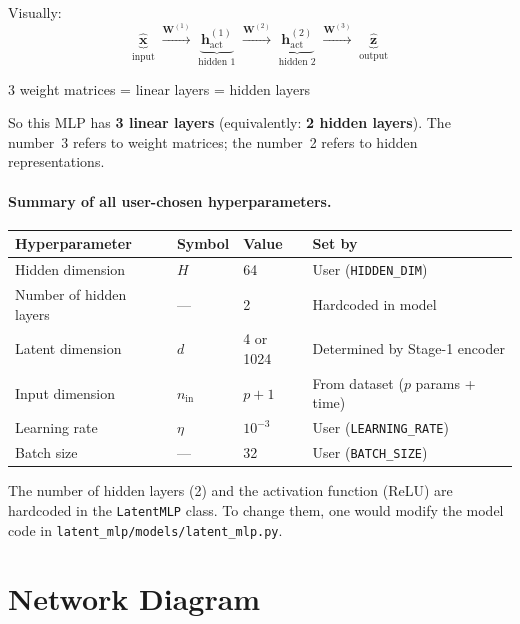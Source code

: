 \documentclass[11pt,a4paper]{article}
\newcommand{\bz}{\mathbf{z}}
\newcommand{\bx}{\mathbf{x}}
\newcommand{\bW}{\mathbf{W}}
\newcommand{\bh}{\mathbf{h}}
\begin{document}
\noindent
Visually:
\[
  \underbrace{\hat{\bx}}_{\text{input}}
  \;\xrightarrow{\bW^{(1)}}\;
  \underbrace{\bh^{(1)}_\text{act}}_{\text{hidden 1}}
  \;\xrightarrow{\bW^{(2)}}\;
  \underbrace{\bh^{(2)}_\text{act}}_{\text{hidden 2}}
  \;\xrightarrow{\bW^{(3)}}\;
  \underbrace{\hat{\bz}}_{\text{output}}
\]
\begin{center}
  3 weight matrices \quad= linear layers \quad= hidden layers
\end{center}

So this MLP has \textbf{3 linear layers} (equivalently:
\textbf{2 hidden layers}).  The number~3 refers to weight matrices;
the number~2 refers to hidden representations.

\paragraph{Summary of all user-chosen hyperparameters.}

\begin{table}[h]
\centering
\begin{tabular}{@{}llll@{}}
\toprule
\textbf{Hyperparameter} & \textbf{Symbol} & \textbf{Value} & \textbf{Set by} \\
\midrule
Hidden dimension  & $H$   & 64      & User (\texttt{HIDDEN\_DIM}) \\
Number of hidden layers & --- & 2  & Hardcoded in model \\
Latent dimension  & $d$   & 4 or 1024 & Determined by Stage-1 encoder \\
Input dimension   & $n_\text{in}$ & $p + 1$ & From dataset ($p$ params + time) \\
Learning rate     & $\eta$ & $10^{-3}$ & User (\texttt{LEARNING\_RATE}) \\
Batch size        & ---   & 32      & User (\texttt{BATCH\_SIZE}) \\
\bottomrule
\end{tabular}
\end{table}

\noindent
The number of hidden layers (2) and the activation function (ReLU) are
hardcoded in the \texttt{LatentMLP} class.  To change them, one would
modify the model code in
\texttt{latent\_mlp/models/latent\_mlp.py}.

\section{Network Diagram}
\end{document}

